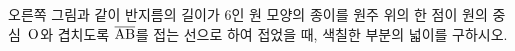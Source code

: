 \noindent\begin{minipage}[t]{0.58\linewidth}\vspace{0pt}\raggedright 오른쪽 그림과 같이 반지름의 길이가 $6$인 원 모양의 종이를 원주 위의 한 점이 원의 중심~$\mathrm{O}$와 겹치도록 $\overline{\mathrm{AB}}$를 접는 선으로 하여 접었을 때, 색칠한 부분의 넓이를 구하시오.\end{minipage}\hfill\begin{minipage}[t]{0.4\linewidth}\vspace{0pt}\centering \resizebox{\ifdim\width>\linewidth\linewidth\else\width\fi}{!}{}\end{minipage}\par
